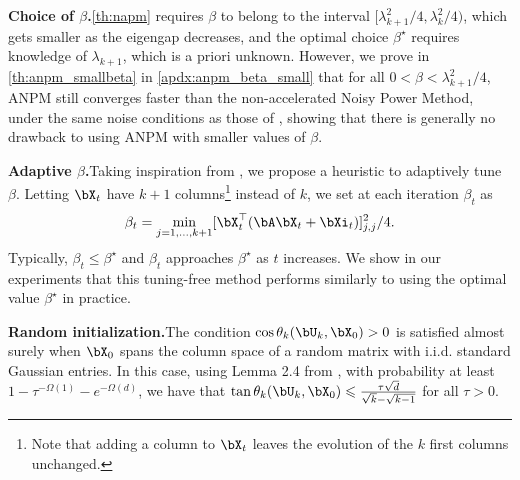 \documentclass{article}
\theoremstyle{plain}
\theoremstyle{definition}
\theoremstyle{remark}
\newcommand{\pa}[1]{\todo[color=yellow]{PA: #1}}
\begin{document}
\textbf{Choice of $\beta$.}\quad \cref{th:napm} requires $\beta$ to belong to the interval $[\lambda_{k+1}^2/4, \lambda_k^2/4)$, which gets smaller as the eigengap decreases, and the optimal choice $\beta^\star$ requires knowledge of $\lambda_{k+1}$, which is a priori unknown. However, we prove in \cref{th:anpm_smallbeta} in \cref{apdx:anpm_beta_small} that for all $0<\beta < \lambda_{k+1}^2/4$, ANPM still converges faster than the non-accelerated Noisy Power Method, under the same noise conditions as those of \citet{hardt14}, showing that there is generally no drawback to using ANPM with smaller values of $\beta$. 

\textbf{Adaptive $\beta$.}\quad Taking inspiration from \citet{xu2023anpm}, we propose a heuristic to adaptively tune $\beta$. Letting $\bX_t$ have $k+1$ columns\footnote{Note that adding a column to $\bX_t$ leaves the evolution of the $k$ first columns unchanged.} instead of $k$, we set at each iteration $\beta_t$ as \pa{footnote clair ?}
\begin{align}
  \beta_t = \min_{j=1,\dots,k+1} [\bX_t^\top(\bA\bX_t + \bXi_t)]_{j,j}^2/4. \label{eq:beta_heuristic}
\end{align}
Typically, $\beta_t \leqslant \beta^\star$ and $\beta_t$ approaches $\beta^\star$ as $t$ increases. We show in our experiments that this tuning-free method performs similarly to using the optimal value $\beta^\star$ in practice.

 \textbf{Random initialization.}\quad The condition $\cos \theta_k(\bU_k, \bX_0) > 0$ is satisfied almost surely when $\bX_0$ spans the column space of a random matrix with i.i.d. standard Gaussian entries. In this case, using Lemma 2.4 from \cite{hardt14}, with probability at least $1 - \tau^{-\Omega(1)} - e^{-\Omega(d)}$, we have that $\tan\theta_k(\bU_k, \bX_0) \leqslant \frac{\tau\sqrt{d}}{\sqrt{k} - \sqrt{k-1}}$ for all $\tau > 0$.
\end{document}
